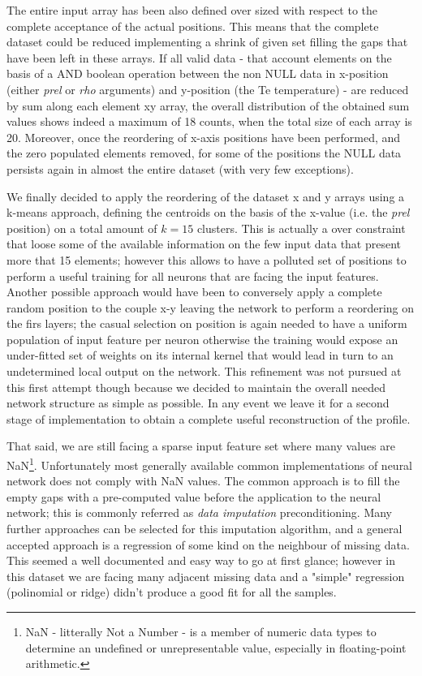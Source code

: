The entire input array has been also defined over sized with respect to the complete acceptance of the actual positions. This means that the complete dataset could be reduced implementing a shrink of given set filling the gaps that have been left in these arrays. If all valid data - that account elements on the basis of a AND boolean operation between the non NULL data in x-position (either \textit{prel} or \textit{rho} arguments) and y-position (the Te temperature) - are reduced by sum along each element xy array, the overall distribution of the obtained sum values shows indeed a maximum of 18 counts, when the total size of each array is 20. Moreover, once the reordering of x-axis positions have been performed, and the zero populated elements removed, for some of the positions the NULL data persists again in almost the entire dataset (with very few exceptions). 

We finally decided to apply the reordering of the dataset x and y arrays using a k-means approach, defining the centroids on the basis of the x-value (i.e. the \textit{prel} position) on a total amount of $k=15$ clusters. This is actually a over constraint that loose some of the available information on the few input data that present more that 15 elements; however this allows to have a polluted set of positions to perform a useful training for all neurons that are facing the input features.
Another possible approach would have been to conversely apply a complete random position to the couple x-y leaving the network to perform a reordering on the firs layers; the casual selection on position is again needed to have a uniform population of input feature per neuron otherwise the training would expose an under-fitted set of weights on its internal kernel that would lead in turn to an undetermined local output on the network.
This refinement was not pursued at this first attempt though because we decided to maintain the overall needed network structure as simple as possible. In any event we leave it for a second stage of implementation to obtain a complete useful reconstruction of the profile.

That said, we are still facing a sparse input feature set where many values are NaN\footnote{NaN - litterally Not a Number - is a member of numeric data types to determine an undefined or unrepresentable value, especially in floating-point arithmetic. }. Unfortunately most generally available common implementations of neural network does not comply with NaN values. The common approach is to fill the empty gaps with a pre-computed value before the application to the neural network; this is commonly referred as \textit{data imputation} preconditioning. Many further approaches can be selected for this imputation algorithm, and a general accepted approach is a regression of some kind on the neighbour of missing data. This seemed a well documented and easy way to go at first glance; however in this dataset we are facing many adjacent missing data and a "simple" regression (polinomial or ridge) didn't produce a good fit for all the samples. 

